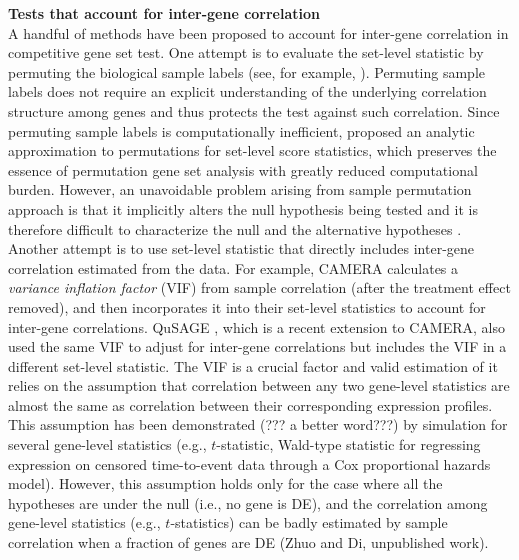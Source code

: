 \documentclass[a4,center,fleqn]{NAR}
\newcommand{\thepapertobefinished}{Zhuo and Di, unpublished work}
\begin{document}
	\textbf{Tests that account for inter-gene correlation}\\
	A handful of methods have been proposed to account for inter-gene correlation in competitive gene
	set test. One attempt is to evaluate the set-level statistic by permuting the biological sample
	labels (see, for example, \cite{subramanian2005gene, efron2007testing}). Permuting sample labels
	does not require an explicit understanding of the underlying correlation structure among genes and
	thus protects the test against such correlation. Since permuting sample labels is computationally
	inefficient, \cite{zhou2013empirical} proposed an analytic approximation to permutations for
	set-level score statistics, which preserves the essence of permutation gene set analysis with
	greatly reduced computational burden. However, an unavoidable problem arising from sample
	permutation approach is that it implicitly alters the null hypothesis being tested and it is
	therefore difficult to characterize the null and the alternative hypotheses
	\citep{goeman2007analyzing, khatri2012ten, wu2012camera}. Another attempt is to use set-level
	statistic that directly includes inter-gene correlation estimated from the data. For example, CAMERA
	\citep{wu2012camera} calculates a \textit{variance inflation factor} (VIF) from sample correlation
	(after the treatment effect removed), and then incorporates it into their set-level statistics to
	account for inter-gene correlations. QuSAGE \citep{yaari2013quantitative}, which is a recent
	extension to CAMERA, also used the same VIF to adjust for inter-gene correlations but includes the
	VIF in a different set-level statistic. The VIF is a crucial factor and valid estimation of it
	relies on the assumption that correlation between any two gene-level statistics are almost the same as
	correlation between their corresponding expression profiles. This assumption has been demonstrated
	(??? a better word???) by simulation \citep{barry2008statistical} for several gene-level statistics
	(e.g., $t$-statistic, Wald-type statistic for regressing expression on censored time-to-event data
	through a Cox proportional hazards model). However, this assumption holds only for the case where
	all the hypotheses are under the null (i.e., no gene is DE), and the correlation among gene-level
	statistics (e.g., $t$-statistics) can be badly estimated by sample correlation when a fraction of
	genes are DE (\thepapertobefinished). 
	
\end{document}
